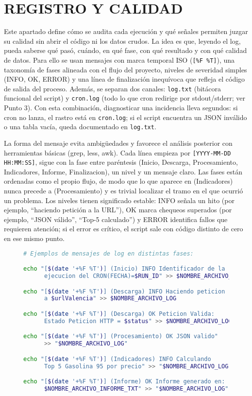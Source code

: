 \chapter{REGISTRO Y CALIDAD}

Este apartado define cómo se audita cada ejecución y qué señales permiten juzgar su calidad sin abrir el código ni los datos crudos. La idea es que, leyendo el log, pueda saberse qué pasó, cuándo, en qué fase, con qué resultado y con qué calidad de datos. Para ello se usan mensajes con marca temporal ISO (\texttt{[\%F \%T]}), una taxonomía de fases alineada con el flujo del proyecto, niveles de severidad simples (INFO, OK, ERROR) y una línea de finalización inequívoca que refleja el código de salida del proceso. Además, se separan dos canales: \texttt{log.txt} (bitácora funcional del script) y \texttt{cron.log} (todo lo que cron redirige por stdout/stderr; ver Punto 3). Con esta combinación, diagnosticar una incidencia lleva segundos: si cron no lanza, el rastro está en \texttt{cron.log}; si el script encuentra un JSON inválido o una tabla vacía, queda documentado en \texttt{log.txt}.

La forma del mensaje evita ambigüedades y favorece el análisis posterior con herramientas básicas (grep, less, awk). Cada línea empieza por \texttt{[YYYY-MM-DD HH:MM:SS]}, sigue con la fase entre paréntesis (Inicio, Descarga, Procesamiento, Indicadores, Informe, Finalizacion), un nivel y un mensaje claro. Las fases están ordenadas como el propio flujo, de modo que lo que aparece en (Indicadores) nunca precede a (Procesamiento) y es trivial localizar el tramo en el que ocurrió un problema. Los niveles tienen significado estable: INFO señala un hito (por ejemplo, ``haciendo petición a la URL''), OK marca chequeos superados (por ejemplo, ``JSON válido'', ``Top-5 calculado'') y ERROR identifica fallos que requieren atención; si el error es crítico, el script sale con código distinto de cero en ese mismo punto.

\begin{figure}[H]
  \begin{lstlisting}[language=bash, caption={Figura 6.1 — Formato de mensajes y fases del log}]
# Ejemplos de mensajes de log en distintas fases:

echo "[$(date '+%F %T')] (Inicio) INFO Identificador de la 
      ejecucion del CRON(FECHA)=$RUN_ID" >> $NOMBRE_ARCHIVO_LOG

echo "[$(date '+%F %T')] (Descarga) INFO Haciendo peticion 
      a $urlValencia" >> $NOMBRE_ARCHIVO_LOG

echo "[$(date '+%F %T')] (Descarga) OK Peticion Valida: 
      Estado Peticion HTTP = $status" >> $NOMBRE_ARCHIVO_LOG

echo "[$(date '+%F %T')] (Procesamiento) OK JSON valido" 
      >> "$NOMBRE_ARCHIVO_LOG"

echo "[$(date '+%F %T')] (Indicadores) INFO Calculando 
      Top 5 Gasolina 95 por precio" >> "$NOMBRE_ARCHIVO_LOG"

echo "[$(date '+%F %T')] (Informe) OK Informe generado en: 
      $NOMBRE_ARCHIVO_INFORME_TXT" >> "$NOMBRE_ARCHIVO_LOG"
\end{lstlisting}
\end{figure}

